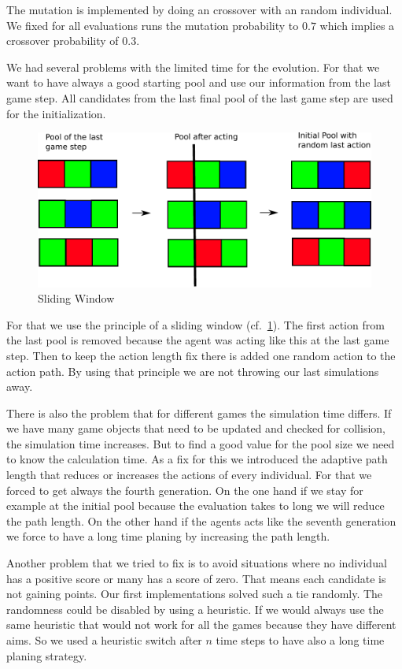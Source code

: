 The mutation is implemented by doing an crossover with an random individual.
We fixed for all evaluations runs the mutation probability to $0.7$ which implies a crossover 
probability of $0.3$.

We had several problems with the limited time for the evolution.
For that we want to have always a good starting pool and use our information from the last
game step. All candidates from the last final pool of the last game step are used for the initialization.


\begin{figure}[H]
\centering
\includegraphics[scale=0.6]{images/sliding_window.pdf}
\caption{Sliding Window}
\label{fig:sliding_window}
\end{figure}

For that we use the principle of a sliding window (cf.~\cref{fig:sliding_window}). The first
action from the last pool is removed because the agent was acting like this at the last game step. Then
to keep the action length fix there is added one random action to the action path.
By using that principle we are not throwing our last simulations away.

There is also the problem that for different games the simulation time differs. If we have many game objects that 
need to be updated and checked for collision, the simulation time increases.
But to find a good value for the pool size we need to know the calculation time.
As a fix for this we introduced the adaptive path length that reduces or increases the actions
of every individual.
For that we forced to get always the fourth generation. On the one hand if we stay for example at the initial
pool because the evaluation takes to long we will reduce the path length. On the other hand if the agents acts like 
the seventh generation we force to have a long time planing by increasing the path length.

Another problem that we tried to fix is to avoid situations where no individual has a positive score or many has a score of zero. That means each 
candidate is not gaining points. Our first implementations solved such a tie randomly. 
The randomness could be disabled by using a heuristic. If we would always use the same heuristic that would not work
for all the games because they have different aims. 
So we used a heuristic switch after $n$ time steps to have also a long time planing strategy.


